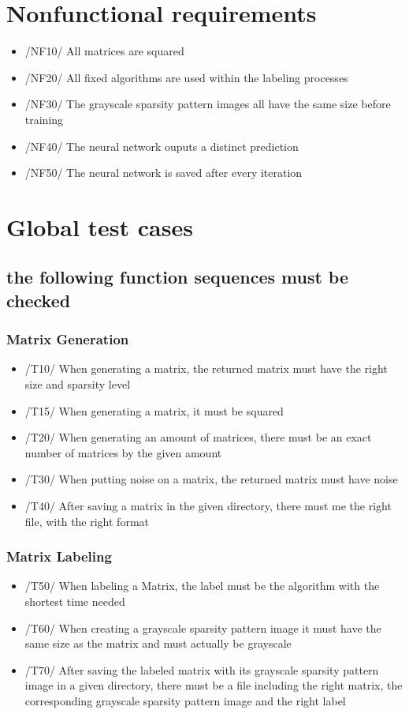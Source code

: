 \documentclass[parskip=full]{scrartcl}
\begin{document}
\section{Nonfunctional requirements}
	\begin{itemize}
		\item /NF10/ All matrices are squared
		\item /NF20/ All fixed \glspl{algorithm} are used within the labeling processes
		\item /NF30/ The \glspl{grayscale sparsity pattern image} all have the same size before training
		\item /NF40/ The \gls{neural network} ouputs a distinct prediction
		\item /NF50/ The \gls{neural network} is saved after every iteration
	\end{itemize}
	

\section{Global test cases}
\subsection{the following function sequences must be checked}
\subsubsection{Matrix Generation}
	\begin{itemize}
		\item /T10/ When generating a matrix, the returned matrix must have the right size and sparsity level
		\item /T15/ When generating a matrix, it must be squared
		\item /T20/ When generating an amount of matrices, there must be an exact number of matrices by the given amount
		\item /T30/ When putting noise on a matrix, the returned matrix must have noise
		\item /T40/ After saving a matrix in the given directory, there must me the right file, with the right format
	\end{itemize}

\subsubsection{Matrix Labeling}
		\begin{itemize}
		\item /T50/ When labeling a Matrix, the label must be the \gls{algorithm} with the shortest time needed
		\item /T60/ When creating a \gls{grayscale sparsity pattern image} it must have the same size as
                       the matrix and must actually be grayscale
		\item /T70/ After saving the labeled matrix with its \gls{grayscale sparsity pattern image} in a given directory, there must be a file including the right matrix, the corresponding \gls{grayscale sparsity pattern image} and the right label
		\end{itemize}
\end{document}
